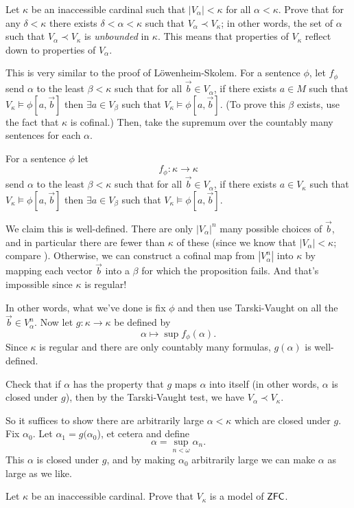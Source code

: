 \begin{dproblem}[Reflection]
	\gim
	Let $\kappa$ be an inaccessible cardinal such that $|V_\alpha| < \kappa$ for all $\alpha < \kappa$.
	Prove that for any $\delta < \kappa$ there exists $\delta < \alpha < \kappa$
	such that $V_\alpha \prec V_\kappa$; in other words,
	the set of $\alpha$ such that $V_\alpha \prec V_\kappa$ is \emph{unbounded} in $\kappa$.
	This means that properties of $V_\kappa$ reflect down to properties of $V_\alpha$.
	\begin{hint}
		This is very similar to the proof of L\"owenheim-Skolem.
		For a sentence $\phi$, let $f_\phi$
		send $\alpha$ to the least $\beta < \kappa$ such that for all $\vec b \in V_\alpha$, if there exists $a \in M$ such that $V_\kappa \vDash \phi[a, \vec b]$ then $\exists a \in V_\beta$ such that $V_\kappa \vDash \phi[a, \vec b]$.
		(To prove this $\beta$ exists, use the fact that $\kappa$ is cofinal.)
		Then, take the supremum over the countably many sentences for each $\alpha$.
	\end{hint}
	\begin{sol}
		For a sentence $\phi$ let \[ f_\phi : \kappa \to \kappa \]
		send $\alpha$ to the least $\beta < \kappa$ such that for all $\vec b \in V_\alpha$, if there exists $a \in V_\kappa$ such that $V_\kappa \vDash \phi[a, \vec b]$ then $\exists a \in V_\beta$ such that $V_\kappa \vDash \phi[a, \vec b]$.

		We claim this is well-defined.
		There are only $\left\lvert V_\alpha \right\rvert^n$ many possible choices of $\vec b$,
		and in particular there are fewer than $\kappa$ of these
		(since we know that $\left\lvert V_\alpha \right\rvert < \kappa$; compare ).
		Otherwise, we can construct a cofinal map from $\left\lvert V_\alpha^n \right\rvert$ 
		into $\kappa$ by mapping each vector $\vec b$ into a $\beta$ for which the proposition fails.
		And that's impossible since $\kappa$ is regular!

		In other words, what we've done is fix $\phi$ and then use Tarski-Vaught on all the $\vec b \in V_\alpha^n$.
		Now let $g : \kappa \to \kappa$ be defined by
		\[ \alpha \mapsto \sup f_\phi(\alpha). \]
		Since $\kappa$ is regular and there are only countably many formulas, $g(\alpha)$ is well-defined.

		Check that if $\alpha$ has the property that $g$ maps $\alpha$ into itself (in other words, $\alpha$ is closed under $g$), then by the Tarski-Vaught test, we have $V_\alpha \prec V_\kappa$.

		So it suffices to show there are arbitrarily large $\alpha < \kappa$ which are closed under $g$.
		Fix $\alpha_0$. Let $\alpha_1 = g(\alpha_0$), et cetera and define
		\[ \alpha = \sup_{n < \omega} \alpha_n. \]
		This $\alpha$ is closed under $g$, and by making $\alpha_0$ arbitrarily large we can make $\alpha$ as large as we like.
	\end{sol}
\end{dproblem}

\begin{sproblem}
	\label{prob:inaccessible_model}
	\gim
	Let $\kappa$ be an inaccessible cardinal.
	Prove that $V_\kappa$ is a model of $\mathsf{ZFC}$.
\end{sproblem}
